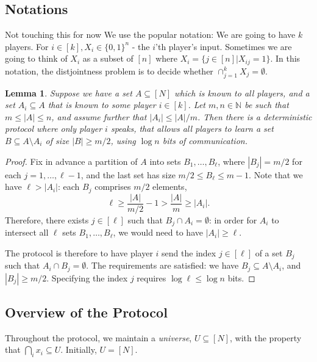\documentclass{article}
\newcommand{\nat}{\mathbb{N}}
\newcommand{\Rnote}[1]{ { \color{magenta} #1 } }
\theoremstyle{plain}
\newtheorem{lemma}[theorem]{Lemma}
\begin{document}
\subsection{Notations}
\Rnote{Not touching this for now}
We use the popular notation: We are going to have $k$ players. For $i \in [k], X_i \in \{0,1\}^{n}$ - the $i$'th player's input. Sometimes we are going to think of $X_i$ as a subset of $[n]$ where $X_i = \{j \in [n] | X_{ij} = 1\}$. In this notation, the distjointness problem is to decide whether $\cap^{k}_{j=1}X_j = \emptyset$. \newline

\begin{lemma}
  Suppose we have a set $A \subseteq [N]$ which is known to all players, and a set $A_i \subseteq A$ that is known to some player $i \in [k]$.
  Let $m, n \in \nat$ be such that $m \leq |A| \leq n$, and assume further that $|A_i| \leq |A|/m$.
  Then there is a deterministic protocol where only player $i$ speaks,
  that allows all players to learn a set $B \subseteq A \setminus A_i$
  of size $|B| \geq m/2$,
  using $\log n$ bits of communication.
  \label{lemma:reveal_zeroes}
\end{lemma}
\begin{proof}
  Fix in advance a partition of $A$ into sets $B_1,\ldots,B_{\ell}$,
  where $|B_j| = m/2$ for each $j = 1,\ldots,\ell-1$,
  and the last set has size $m/2 \leq B_{\ell} \leq m - 1$.
  Note that we have $\ell > |A_i|$:
  each $B_j$ comprises $m/2$ elements,
  \begin{equation*}
    \ell \geq \frac{|A|}{m/2} - 1 > \frac{|A|}{m} \geq |A_i|.
  \end{equation*}
  Therefore, there exists $j \in [\ell]$ such that $B_j \cap A_i = \emptyset$:
  in order for $A_i$ to intersect all $\ell$ sets $B_1,\ldots,B_{\ell}$,
  we would need to have $|A_i| \geq \ell$.

  The protocol is therefore to have player $i$ send the index $j \in [\ell]$ of a set $B_j$
  such that $A_i \cap B_j = \emptyset$.
  The requirements are satisfied: we have $B_j \subseteq A \setminus A_i$,
  and $|B_j| \geq m / 2$.
  Specifying the index $j$ requires $\log \ell \leq \log n$ bits.
  
\end{proof}



\subsection{Overview of the Protocol}
Throughout the protocol, we maintain a \emph{universe}, $U \subseteq [N]$,
with the property that $\bigcap_i x_i \subseteq U$.
Initially, $U = [N]$.
\end{document}

